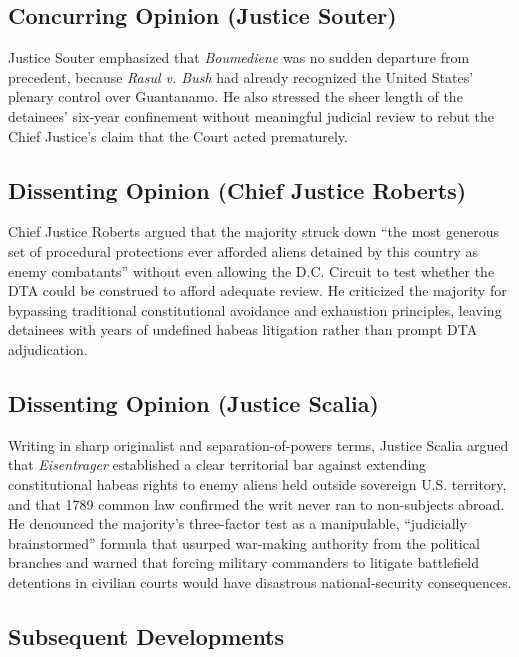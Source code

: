 \documentclass[12pt]{article}
\begin{document}
\subsection{Concurring Opinion (Justice Souter)}

Justice Souter emphasized that \textit{Boumediene} was no sudden departure from precedent, because \textit{Rasul v. Bush} had already recognized the United States' plenary control over Guantanamo. He also stressed the sheer length of the detainees' six-year confinement without meaningful judicial review to rebut the Chief Justice's claim that the Court acted prematurely.

\subsection{Dissenting Opinion (Chief Justice Roberts)}

Chief Justice Roberts argued that the majority struck down ``the most generous set of procedural protections ever afforded aliens detained by this country as enemy combatants'' without even allowing the D.C. Circuit to test whether the DTA could be construed to afford adequate review. He criticized the majority for bypassing traditional constitutional avoidance and exhaustion principles, leaving detainees with years of undefined habeas litigation rather than prompt DTA adjudication.

\subsection{Dissenting Opinion (Justice Scalia)}

Writing in sharp originalist and separation-of-powers terms, Justice Scalia argued that \textit{Eisentrager} established a clear territorial bar against extending constitutional habeas rights to enemy aliens held outside sovereign U.S. territory, and that 1789 common law confirmed the writ never ran to non-subjects abroad. He denounced the majority's three-factor test as a manipulable, ``judicially brainstormed'' formula that usurped war-making authority from the political branches and warned that forcing military commanders to litigate battlefield detentions in civilian courts would have disastrous national-security consequences.

\subsection{Subsequent Developments}
\end{document}
